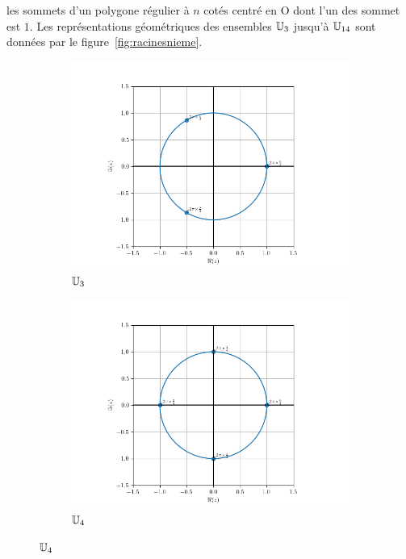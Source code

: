 les sommets d'un polygone régulier à \(n\) cotés centré en O dont l'un des 
sommet est \(1\). Les représentations géométriques des ensembles \(\mathbb{U}_3\) 
jusqu'à \(\mathbb{U}_{14}\) sont données par le figure~\ref{fig:racinesnieme}.
\begin{figure}
    \begin{subfigure}{.3\textwidth}
        \centering
        \includegraphics[scale=.33]{U_3.png}  
        \caption{$\mathbb{U}_3$}
        \label{fig:U3}
    \end{subfigure}
    \begin{subfigure}{.3\textwidth}
        \centering
        \includegraphics[scale=.33]{U_4.png}  
        \caption{$\mathbb{U}_4$}

\end{subfigure}
\end{figure}
